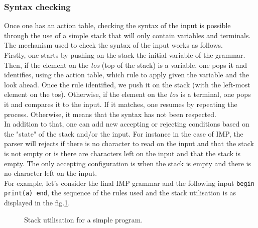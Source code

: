 \documentclass[a4paper,11pt]{article}
\begin{document}
    \subsubsection{Syntax checking}
      \label{sec:syntaxchecking}
      Once one has an action table, checking the syntax of the input is possible through the use of a simple stack that will only contain variables and terminals. The mechanism used to check the syntax of the input works as follows.\\
      Firstly, one starts by pushing on the stack the initial variable of the grammar. Then, if the element on the \textit{tos} (top of the stack) is a variable, one pops it and identifies, using the action table, which rule to apply given the variable and the look ahead. Once the rule identified, we push it on the stack (with the left-most element on the tos). Otherwise, if the element on the \textit{tos} is a terminal, one pops it and compares it to the input. If it matches, one resumes by repeating the process. Otherwise, it means that the syntax has not been respected.\\
      In addition to that, one can add new accepting or rejecting conditions based on the "state" of the stack and/or the input. For instance in the case of IMP, the parser will rejects if there is no character to read on the input and that the stack is not empty or is there are characters left on the input and that the stack is empty. The only accepting configuration is when the stack is empty and there is no character left on the input.\\
      For example, let's consider the final IMP grammar and the following input \verb|begin print(a) end|, the sequence of the rules used and the stack utilisation is as displayed in the fig.\ref{fig:simpleprogram}.
      \begin{figure}[h!]
        
        \caption{Stack utilisation for a simple program.}
        \label{fig:simpleprogram}
      \end{figure}
      
\end{document}
